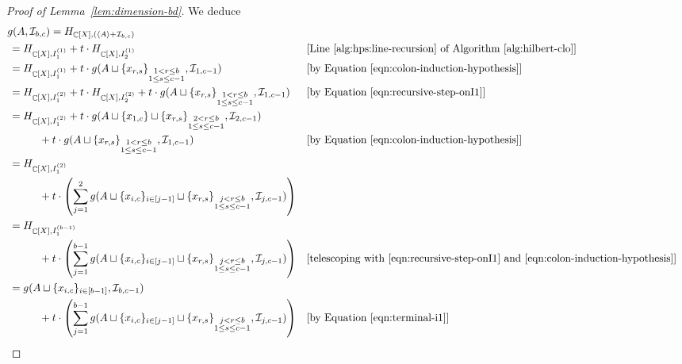 \documentclass[11pt,reqno]{amsart}
\DeclareMathOperator{\C}{\mathbb{C}}
\newcommand*{\eqcommentnear}[1]{&&\text{[#1]}}
\newcommand{\ideal}[1]{\left\langle#1\right\rangle}
\theoremstyle{definition}
\numberwithin{equation}{section}
\begin{document}
\begin{proof}[Proof of Lemma~\ref{lem:dimension-bd}]
We deduce
\begin{align}
&g(A, \mathcal{I}_{b, c}) = H_{\C[X], (\ideal{A} + \mathcal{I}_{b, c})} \nonumber \\
&\,= H_{\C[X], I_{1}^{(1)}} + t\cdot H_{\C[X], I_{2}^{(1)}} \eqcommentnear{Line \ref{alg:hps:line-recursion} of Algorithm \ref{alg:hilbert-clo}} \nonumber \\
&\,= H_{\C[X], I_{1}^{(1)}} + t\cdot g(A \sqcup \{x_{r, s}\}_{\substack{1 < r \le b \\ 1 \le s \le c-1}}, \mathcal{I}_{1, c-1}) \eqcommentnear{by Equation \eqref{eqn:colon-induction-hypothesis}} \nonumber \\
&\,= H_{\C[X], I_1^{(2)}} + t\cdot H_{\C[X], I_2^{(2)}} + t\cdot g(A \sqcup \{x_{r, s}\}_{\substack{1 < r \le b \\ 1 \le s \le c-1}}, \mathcal{I}_{1, c-1}) \eqcommentnear{by Equation \eqref{eqn:recursive-step-onI1}} \nonumber \\
&\,= H_{\C[X], I_1^{(2)}} + t\cdot g(A \sqcup \{x_{1, c}\} \sqcup \{x_{r, s}\}_{\substack{2 < r \le b \\ 1 \le s \le c-1}}, \mathcal{I}_{2, c-1}) \nonumber \\
&\qquad \quad + t\cdot g(A \sqcup \{x_{r, s}\}_{\substack{1 < r \le b \\ 1 \le s \le c-1}}, \mathcal{I}_{1, c-1}) \eqcommentnear{by Equation \eqref{eqn:colon-induction-hypothesis}} \nonumber \\
&\,= H_{\C[X], I_1^{(2)}} \nonumber \\
&\qquad \quad + t\cdot \left(\sum_{j=1}^{2} g(A \sqcup \{x_{i, c}\}_{i \in [j-1]} \sqcup \{x_{r, s}\}_{\substack{j < r \le b \\ 1 \le s \le c-1}}, \mathcal{I}_{j, c-1})\right) \nonumber \\
&\,= H_{\C[X], I_1^{(b-1)}} \nonumber \\
&\qquad \quad + t\cdot \left(\sum_{j=1}^{b-1} g(A \sqcup \{x_{i, c}\}_{i \in [j-1]} \sqcup \{x_{r, s}\}_{\substack{j < r \le b \\ 1 \le s \le c-1}}, \mathcal{I}_{j, c-1})\right) \eqcommentnear{telescoping with \eqref{eqn:recursive-step-onI1} and \eqref{eqn:colon-induction-hypothesis}} \nonumber \\
&\,= g(A \sqcup \{x_{i, c}\}_{i \in [b-1]}, \mathcal{I}_{b, c-1}) \nonumber \\
&\qquad \quad + t\cdot \left(\sum_{j=1}^{b-1} g(A \sqcup \{x_{i, c}\}_{i \in [j-1]} \sqcup \{x_{r, s}\}_{\substack{j < r \le b \\ 1 \le s \le c-1}}, \mathcal{I}_{j, c-1})\right) \eqcommentnear{by Equation \eqref{eqn:terminal-i1}} \nonumber \\

\end{align}
\end{proof}
\end{document}
